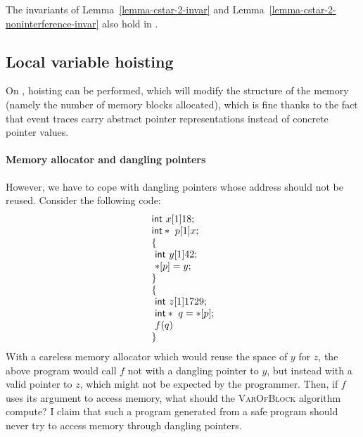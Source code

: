 \begin{lemma}
  The invariants of Lemma~\ref{lemma-cstar-2-invar} and
  Lemma~\ref{lemma-cstar-2-noninterference-invar} also hold in .
\end{lemma}

\subsection{Local variable hoisting} \label{sec:hoisting}

On , hoisting can be performed, which will modify the structure of
the memory (namely the number of memory blocks allocated), which is
fine thanks to the fact that event traces carry abstract pointer
representations instead of concrete pointer values.

\paragraph{Memory allocator and dangling pointers}
However, we have to cope with dangling pointers whose address should
not be reused. Consider the following \cstar code:
\[
\begin{array}{l}
  \text{\textsf{int}}\ x[1]{18}; \\
  \text{\textsf{int}} *\ p[1]{x}; \\
  \{ \\
  ~ \text{\textsf{int}}\ y[1]{42}; \\
  ~ *[p] = y; \\
  \} \\
  \{ \\
  ~ \text{\textsf{int}}\ z[1]{1729}; \\
  ~ \text{\textsf{int}} *\ q = *[p]; \\
  ~ f(q) \\
  \} \\
\end{array}
\]
With a careless memory allocator which would reuse the space of $y$
for $z$, the above program would call $f$ not with a dangling pointer
to $y$, but instead with a valid pointer to $z$, which might not be
expected by the programmer. Then, if $f$ uses its argument to access
memory, what should the \textsc{VarOfBlock} algorithm compute? I claim
that such a  program generated from a safe \fstar program should never
try to access memory through dangling pointers.

